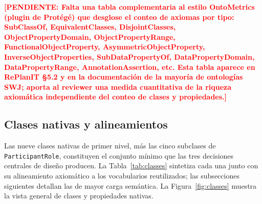 \documentclass[Afour,sagev,times]{sagej}
\newcommand{\code}[1]{\texttt{#1}}
\newcommand{\TODO}[1]{\textcolor{red}{\textbf{[PENDIENTE: #1]}}}
\begin{document}
\TODO{Falta una tabla complementaria al estilo OntoMetrics (plugin de Protégé) que desglose el conteo de axiomas por tipo: SubClassOf, EquivalentClasses, DisjointClasses, ObjectPropertyDomain, ObjectPropertyRange, FunctionalObjectProperty, AsymmetricObjectProperty, InverseObjectProperties, SubDataPropertyOf, DataPropertyDomain, DataPropertyRange, AnnotationAssertion, etc. Esta tabla aparece en RePlanIT §5.2 y en la documentación de la mayoría de ontologías SWJ; aporta al reviewer una medida cuantitativa de la riqueza axiomática independiente del conteo de clases y propiedades.}

\subsection{Clases nativas y alineamientos}\label{sec:classes}

Las nueve clases nativas de primer nivel, más las cinco subclases de \code{ParticipantRole}, constituyen el conjunto mínimo que las tres decisiones centrales de diseño producen. La Tabla~\ref{tab:classes} sintetiza cada una junto con su alineamiento axiomático a los vocabularios reutilizados; las subsecciones siguientes detallan las de mayor carga semántica. La Figura~\ref{fig:classes} muestra la vista general de clases y propiedades nativas.
\end{document}
